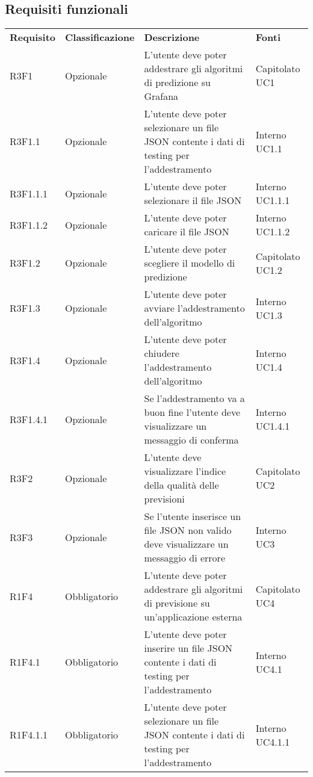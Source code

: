 \subsection{Requisiti funzionali}
	\setcounter{table}{0}
	\begin{longtable} {
		>{}p{24mm} 
		>{}p{32mm}
		>{}p{40mm} 
		>{}p{24.5mm}
		}
	\rowcolor{gray!50}
		\textbf{Requisito} & \textbf{Classificazione} & \textbf{Descrizione} & \textbf{Fonti} 	\TBstrut \\
		R3F1 & Opzionale & L'utente deve poter addestrare gli algoritmi di predizione su Grafana\glo & Capitolato UC1 \TBstrut \\ [2mm]
		R3F1.1 & Opzionale & L'utente deve poter selezionare un file JSON contente i dati di testing per l'addestramento & Interno UC1.1 \TBstrut \\ [2mm]
		R3F1.1.1 & Opzionale & L'utente deve poter selezionare il file JSON & Interno UC1.1.1 \TBstrut \\ [2mm]
		R3F1.1.2 & Opzionale & L'utente deve poter caricare il file JSON & Interno UC1.1.2 \TBstrut \\ [2mm]
		R3F1.2 & Opzionale & L'utente deve poter scegliere il modello di predizione & Capitolato UC1.2 \TBstrut \\ [2mm]
		R3F1.3 & Opzionale & L'utente deve poter avviare l'addestramento dell'algoritmo & Interno UC1.3 \TBstrut \\ [2mm]
		R3F1.4 & Opzionale & L'utente deve poter chiudere l'addestramento dell'algoritmo & Interno UC1.4 \TBstrut \\ [2mm]
		R3F1.4.1 & Opzionale & Se l'addestramento va a buon fine l'utente deve visualizzare un messaggio di conferma & Interno UC1.4.1 \TBstrut \\ [2mm]		
		R3F2 & Opzionale & L'utente deve visualizzare l'indice della qualità delle previsioni & Capitolato UC2 \TBstrut \\ [2mm]
		R3F3 & Opzionale & Se l'utente inserisce un file JSON non valido deve visualizzare un messaggio di errore & Interno UC3 \TBstrut \\ [2mm]		
		R1F4 & Obbligatorio & L'utente deve poter addestrare gli algoritmi di previsione su un'applicazione esterna & Capitolato UC4 \TBstrut \\ [2mm]		
		R1F4.1 & Obbligatorio & L'utente deve poter inserire un file JSON contente i dati di testing per l'addestramento & Interno UC4.1 \TBstrut \\ [2mm]		
		R1F4.1.1 & Obbligatorio & L'utente deve poter selezionare un file JSON contente i dati di testing per l'addestramento & Interno UC4.1.1 \TBstrut \\ [2mm]

\end{longtable}
